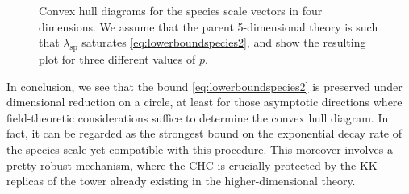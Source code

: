 \begin{figure}[htb]
\begin{center}
	\caption{Convex hull diagrams for the species scale vectors in four dimensions. We assume that the parent 5-dimensional theory is such that $\lambda_{\text{sp}}$ saturates \eqref{eq:lowerboundspecies2}, and show the resulting plot for three different values of $p$.}
	\label{fig:dim-red}	
\end{center}
\end{figure}

In conclusion, we see that the bound \eqref{eq:lowerboundspecies2} is preserved under dimensional reduction on a circle, at least for those asymptotic directions where field-theoretic considerations suffice to determine the convex hull diagram. In fact, it can be regarded as the strongest bound on the exponential decay rate of the species scale yet compatible with this procedure. This moreover involves a pretty robust mechanism, where the CHC is crucially protected by the KK replicas of the tower already existing in the higher-dimensional theory. 

